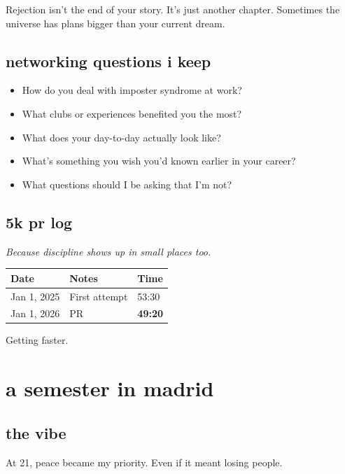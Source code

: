 \documentclass[12pt, letterpaper]{article}
\newenvironment{jadequote}{%
  \begin{mdframed}[backgroundcolor=soft, linecolor=moxie, linewidth=1pt,
    innerleftmargin=10pt, innerrightmargin=10pt,
    innertopmargin=8pt, innerbottommargin=8pt]
  \itshape
}{%
  \end{mdframed}
}
\begin{document}
\begin{jadequote}
Rejection isn't the end of your story. It's just another chapter. Sometimes the universe has plans bigger than your current dream.
\end{jadequote}

\subsection{networking questions i keep}
\begin{itemize}
  \item How do you deal with imposter syndrome at work?
  \item What clubs or experiences benefited you the most?
  \item What does your day-to-day actually look like?
  \item What's something you wish you'd known earlier in your career?
  \item What questions should I be asking that I'm not?
\end{itemize}

\subsection{5k pr log}

\textit{Because discipline shows up in small places too.}

\begin{center}
\begin{tabular}{lll}
\toprule
\textbf{Date} & \textbf{Notes} & \textbf{Time} \\
\midrule
Jan 1, 2025 & First attempt & 53:30 \\
Jan 1, 2026 & PR & \textbf{49:20} \\
\bottomrule
\end{tabular}
\end{center}

Getting faster.

\section{a semester in madrid}

\subsection{the vibe}

\begin{jadequote}
At 21, peace became my priority. Even if it meant losing people.
\end{jadequote}
\end{document}
